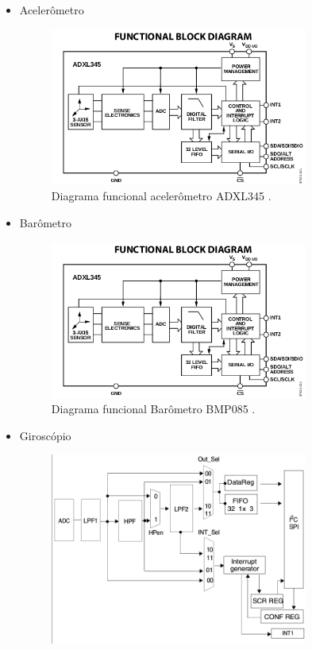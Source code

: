 \begin{itemize}
  \item Acelerômetro
  \begin{figure}[H]
    \centering
    \includegraphics[width=0.8\textwidth]{figuras/2}
    \caption{Diagrama funcional acelerômetro ADXL345 \cite{acelerometro}.}
    \label{img:acelerometro}
  \end{figure}
  \item Barômetro
  \begin{figure}[H]
    \centering
    \includegraphics[width=0.8\textwidth]{figuras/2}
    \caption{Diagrama funcional Barômetro BMP085 \cite{barometro}.}
    \label{img:barometro}
  \end{figure}
  \item Giroscópio
  \begin{figure}[H]
    \centering
    \includegraphics[width=0.8\textwidth]{figuras/4}

\end{figure}
\end{itemize}
